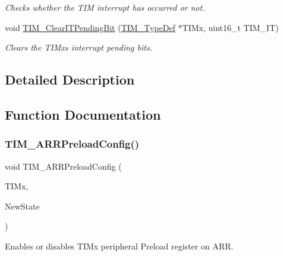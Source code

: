\begin{DoxyCompactItemize}
\begin{DoxyCompactList}\small\item\em Checks whether the T\+IM interrupt has occurred or not. \end{DoxyCompactList}\item 
void \mbox{\hyperlink{group___t_i_m___exported___functions_ga9eb1e95af71ed380f51a2c6d585cc5d6}{T\+I\+M\+\_\+\+Clear\+I\+T\+Pending\+Bit}} (\mbox{\hyperlink{struct_t_i_m___type_def}{T\+I\+M\+\_\+\+Type\+Def}} $\ast$T\+I\+Mx, uint16\+\_\+t T\+I\+M\+\_\+\+IT)
\begin{DoxyCompactList}\small\item\em Clears the T\+I\+Mx\textquotesingle{}s interrupt pending bits. \end{DoxyCompactList}\end{DoxyCompactItemize}


\subsection{Detailed Description}


\subsection{Function Documentation}
\mbox{\label{group___t_i_m___exported___functions_ga42b44b9fc2b0798d733720dd6bac1ac0}} 
\subsubsection{\texorpdfstring{TIM\_ARRPreloadConfig()}{TIM\_ARRPreloadConfig()}}
{\footnotesize\ttfamily void T\+I\+M\+\_\+\+A\+R\+R\+Preload\+Config (\begin{DoxyParamCaption}\item[{\mbox{\hyperlink{struct_t_i_m___type_def}{T\+I\+M\+\_\+\+Type\+Def}} $\ast$}]{T\+I\+Mx,  }\item[{\mbox{\hyperlink{group___exported__types_gac9a7e9a35d2513ec15c3b537aaa4fba1}{Functional\+State}}}]{New\+State }\end{DoxyParamCaption})}



Enables or disables T\+I\+Mx peripheral Preload register on A\+RR. 


